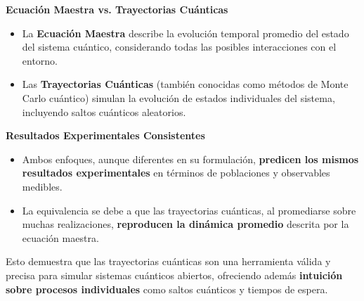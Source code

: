 \documentclass[11pt]{beamer}
\begin{document}
\begin{frame}
    
        \textbf{Ecuación Maestra vs. Trayectorias Cuánticas}
        
        \begin{itemize}
            \item La \textbf{Ecuación Maestra} describe la evolución temporal promedio del estado del sistema cuántico, considerando todas las posibles interacciones con el entorno.
            \item Las \textbf{Trayectorias Cuánticas} (también conocidas como métodos de Monte Carlo cuántico) simulan la evolución de estados individuales del sistema, incluyendo saltos cuánticos aleatorios.
        \end{itemize}
        
        \textbf{Resultados Experimentales Consistentes}
        
        \begin{itemize}
            \item Ambos enfoques, aunque diferentes en su formulación, \textbf{predicen los mismos resultados experimentales} en términos de poblaciones y observables medibles.
            \item La equivalencia se debe a que las trayectorias cuánticas, al promediarse sobre muchas realizaciones, \textbf{reproducen la dinámica promedio} descrita por la ecuación maestra.
        \end{itemize}
        
      
        
    
          Esto demuestra que las trayectorias cuánticas son una herramienta válida y precisa para simular sistemas cuánticos abiertos, ofreciendo además \textbf{intuición sobre procesos individuales} como saltos cuánticos y tiempos de espera.
        
       
    
    \end{frame}
\end{document}
